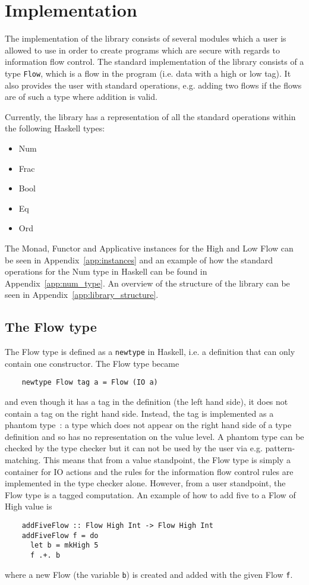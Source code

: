 \chapter{Implementation}
\label{chapter:implementation}
The implementation of the library consists of several modules which a user is allowed to use in order to create programs which are secure with regards to information flow control. The standard implementation of the library consists of a type {\tt Flow}, which is a flow in the program (i.e. data with a high or low tag). It also provides the user with standard operations, e.g. adding two flows if the flows are of such a type where addition is valid.

Currently, the library has a representation of all the standard operations within the following Haskell types:
\begin{itemize}
  \item Num
  \item Frac
  \item Bool
  \item Eq
  \item Ord
\end{itemize}

The Monad, Functor and Applicative instances for the High and Low Flow can be seen in Appendix~\ref{app:instances} and an example of how the standard operations for the Num type in Haskell can be found in Appendix~\ref{app:num_type}. An overview of the structure of the library can be seen in Appendix~\ref{app:library_structure}.
\section{The Flow type}
\label{sec:flow}
The Flow type is defined as a {\tt newtype} in Haskell, i.e. a definition that can only contain one constructor. The Flow type became
\begin{verbatim}
    newtype Flow tag a = Flow (IO a)
\end{verbatim}
and even though it has a tag in the definition (the left hand side), it does not contain a tag on the right hand side. Instead, the tag is implemented as a phantom type~\cite{haskell_phantom}: a type which does not appear on the right hand side of a type definition and so has no representation on the value level. A phantom type can be checked by the type checker but it can not be used by the user via e.g. pattern-matching. This means that from a value standpoint, the Flow type is simply a container for IO actions and the rules for the information flow control rules are implemented in the type checker alone. However, from a user standpoint, the Flow type is a tagged computation. An example of how to add five to a Flow of High value is
\begin{verbatim}
    addFiveFlow :: Flow High Int -> Flow High Int
    addFiveFlow f = do
      let b = mkHigh 5
      f .+. b
\end{verbatim}
where a new Flow (the variable {\tt b}) is created and added with the given Flow {\tt f}.

